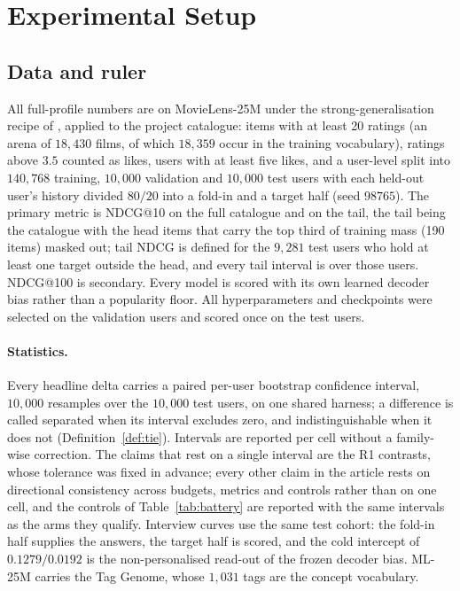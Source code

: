 \documentclass[manuscript,screen]{acmart}
\begin{document}
\section{Experimental Setup}\label{sec:setup}

\subsection{Data and ruler}
All full-profile numbers are on MovieLens-25M under the strong-generalisation recipe of \citet{liang2018variational}, applied to the project catalogue: items with at least 20 ratings (an arena of $18{,}430$ films, of which $18{,}359$ occur in the training vocabulary), ratings above $3.5$ counted as likes, users with at least five likes, and a user-level split into $140{,}768$ training, $10{,}000$ validation and $10{,}000$ test users with each held-out user's history divided $80/20$ into a fold-in and a target half (seed $98765$). The primary metric is NDCG@10 on the full catalogue and on the tail, the tail being the catalogue with the head items that carry the top third of training mass (190 items) masked out; tail NDCG is defined for the $9{,}281$ test users who hold at least one target outside the head, and every tail interval is over those users. NDCG@100 is secondary. Every model is scored with its own learned decoder bias rather than a popularity floor. All hyperparameters and checkpoints were selected on the validation users and scored once on the test users.

\paragraph{Statistics.} Every headline delta carries a paired per-user bootstrap confidence interval, $10{,}000$ resamples over the $10{,}000$ test users, on one shared harness; a difference is called separated when its interval excludes zero, and indistinguishable when it does not (Definition~\ref{def:tie}). Intervals are reported per cell without a family-wise correction. The claims that rest on a single interval are the R1 contrasts, whose tolerance was fixed in advance; every other claim in the article rests on directional consistency across budgets, metrics and controls rather than on one cell, and the controls of Table~\ref{tab:battery} are reported with the same intervals as the arms they qualify. Interview curves use the same test cohort: the fold-in half supplies the answers, the target half is scored, and the cold intercept of $0.1279/0.0192$ is the non-personalised read-out of the frozen decoder bias. ML-25M carries the Tag Genome, whose $1{,}031$ tags are the concept vocabulary.
\end{document}
